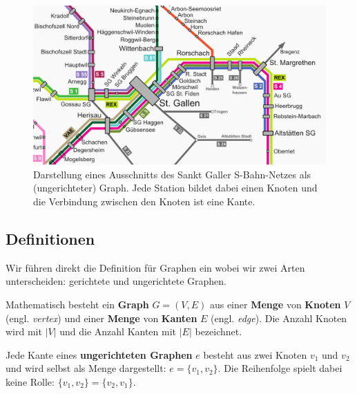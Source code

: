 \begin{figure}[htb]
\begin{center}

\includegraphics[width=.67\textwidth]{../fig/sbahn_netz_ausschnitt.png}
\caption{Darstellung eines Ausschnitts des Sankt Galler S-Bahn-Netzes als (ungerichteter) Graph.
Jede Station bildet dabei einen Knoten und die Verbindung zwischen den Knoten ist eine Kante.
}

\label{fig:sbahn}
\end{center}
\end{figure}


\subsection{Definitionen}

Wir führen direkt die Definition für Graphen ein wobei wir zwei Arten unterscheiden: gerichtete und ungerichtete Graphen.

\begin{mdef}
Mathematisch besteht ein \textbf{Graph} $G=(V,E)$ aus einer \textbf{Menge} von \textbf{Knoten} $V$ (engl. \emph{vertex}) und einer \textbf{Menge} von \textbf{Kanten} $E$ (engl. \emph{edge}).
Die Anzahl Knoten wird mit $|V|$ und die Anzahl Kanten mit $|E|$ bezeichnet.
\end{mdef}



\begin{mdef}
Jede Kante eines \textbf{ungerichteten Graphen} $e$ besteht aus zwei Knoten $v_1$ und $v_2$ und wird selbst als Menge dargestellt: $e= \{v_1,v_2\}$.
Die Reihenfolge spielt dabei keine Rolle: $\{v_1,v_2\} = \{v_2,v_1\}$.
\end{mdef}


